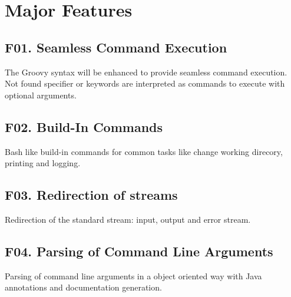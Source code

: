 \section{Major Features}
 
\subsection{F01. Seamless Command Execution}

The Groovy syntax will be enhanced to provide seamless command execution.
Not found specifier or keywords are interpreted as commands to execute with
optional arguments.

\subsection{F02. Build-In Commands}

Bash like build-in commands for common tasks like change working direcory,
printing and logging.

\subsection{F03. Redirection of streams}

Redirection of the standard stream: input, output and error stream.

\subsection{F04. Parsing of Command Line Arguments}

Parsing of command line arguments in a object oriented way with Java
annotations and documentation generation.
